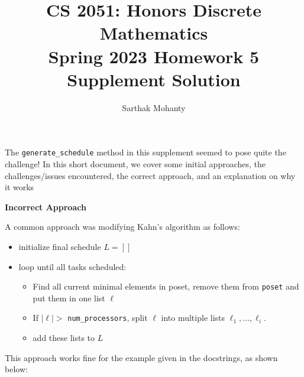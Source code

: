 \documentclass{article}
\title{\vspace{-1cm}CS 2051: Honors Discrete Mathematics \\Spring 2023 Homework 5 Supplement Solution}
\author{Sarthak Mohanty }
\date{}
\begin{document}
\maketitle

The \lstinline{generate_schedule} method in this supplement seemed to pose quite the challenge! In this short document, we cover some initial approaches, the challenges/issues encountered, the correct approach, and an explanation on why it works

\begin{center}
    \textbf{Incorrect Approach}
\end{center}

A common approach was modifying Kahn's algorithm as follows:
\begin{itemize}
    \item initialize final schedule $L = []$
    \item loop until all tasks scheduled:
    \begin{itemize}
        \item Find all current minimal elements in poset, remove them from \lstinline{poset} and put them in one list $\ell$
        \item If $|\ell| >$ \lstinline{num_processors}, split $\ell$ into multiple lists $\ell_{1}, \dots, \ell_{i}$.
        \item add these lists to $L$
    \end{itemize}
\end{itemize}

This approach works fine for the example given in the docstrings, as shown below:
    \begin{center}
    \end{center}
\end{document}
